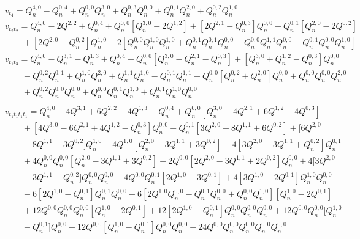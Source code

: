 \documentclass[11p,reqno]{amsart}
\numberwithin{equation}{section}
\numberwithin{equation}{section}
\begin{document}
\begin{align*}
    &v_{t_4} = Q_n^{4, 0} - Q_n^{0, 4} + Q_n^{0, 0}Q_n^{3, 0} + Q_n^{0, 3}Q_n^{0, 0} + Q_n^{0, 1}Q_n^{2, 0} + Q_n^{0, 2}Q_n^{1, 0}\\
    &v_{t_2t_2} = Q_n^{4, 0} - 2Q^{2, 2} + Q_n^{0, 4} + Q_n^{0, 0}[Q_n^{3, 0} - 2Q^{1, 2}] + [2Q^{2, 1} - Q_n^{0, 3}]Q_n^{0, 0} + Q_n^{0, 1}[Q_n^{2, 0} - 2Q^{0, 2}] \\
    & \qquad + [2Q^{2, 0} - Q_n^{0, 2}]Q_n^{1, 0} + 2[Q_n^{0, 0}Q_n^{1, 0}Q_n^{1, 0} + Q_n^{0, 1}Q_n^{0, 1}Q_n^{0, 0} + Q_n^{0, 0}Q_n^{1, 1}Q_n^{0, 0} + Q_n^{0, 1}Q_n^{0, 0}Q_n^{1, 0}] \\
    &v_{t_1t_3} = Q_n^{4, 0} - Q_n^{3, 1} - Q_n^{1, 3} + Q_n^{0, 4} + Q_n^{0, 0}[Q_n^{3, 0} - Q_n^{2, 1} - Q_n^{0, 3}] + [Q_n^{3, 0} + Q_n^{1, 2} - Q_n^{0, 3}]Q_n^{0, 0} \\
    & \qquad - Q_n^{0, 2}Q_n^{0, 1} + Q_n^{1, 0}Q_n^{2, 0} + Q_n^{1, 1}Q_n^{1, 0} - Q_n^{0, 1}Q_n^{1, 1} + Q_n^{0, 0}[Q_n^{0, 2} + Q_n^{2, 0}]Q_n^{0, 0} + Q_n^{0, 0}Q_n^{0, 0}Q_n^{2, 0} \\ 
    & \qquad + Q_n^{0, 2}Q_n^{0, 0}Q_n^{0, 0} + Q_n^{0, 0}Q_n^{0, 1}Q_n^{1, 0} + Q_n^{0, 1}Q_n^{1, 0}Q_n^{0, 0} \\
\end{align*}
\begin{align*}
    &v_{t_1t_1t_1t_1} = Q_n^{4, 0} - 4Q^{3, 1} + 6Q^{2, 2} -4Q^{1, 3} + Q_n^{0, 4} + Q_n^{0, 0}[Q_n^{3, 0} - 4Q^{2, 1} + 6Q^{1, 2} - 4Q^{0, 3}] \\ 
    & \qquad + [4Q^{3, 0} - 6Q^{2, 1} + 4Q^{1, 2} - Q_n^{0, 3}]Q_n^{0, 0} - Q_n^{0, 1}[3Q^{2, 0} - 8Q^{1, 1} + 6Q^{0, 2}] + [6Q^{2, 0} \\ 
    & \qquad - 8Q^{1, 1} + 3Q^{0, 2}]Q_n^{1, 0} + 4Q^{1, 0}[Q_n^{2, 0} - 3Q^{1, 1} + 3Q^{0, 2}] - 4[3Q^{2, 0} - 3Q^{1, 1} + Q_n^{0, 2}]Q_n^{0, 1} \\ 
    & \qquad + 4 Q_n^{0, 0}Q_n^{0, 0}[Q_n^{2, 0} - 3Q^{1, 1} + 3Q^{0, 2}] + 2Q^{0, 0}[2Q^{2, 0} - 3Q^{1, 1} + 2Q^{0, 2}]Q_n^{0, 0} + 4[3Q^{2, 0} \\
    & \qquad - 3Q^{1, 1} + Q_n^{0, 2}]Q_n^{0, 0}Q_n^{0, 0} -4Q^{0, 0}Q_n^{0, 1}[2Q^{1, 0} - 3Q^{0, 1}] + 4[3Q^{1, 0} - 2Q^{0, 1}]Q_n^{1, 0}Q_n^{0, 0} \\
    & \qquad -6[2Q^{1, 0} - Q_n^{0, 1}]Q_n^{0, 1}Q_n^{0, 0} + 6[2Q^{1, 0}Q_n^{0, 0} - Q_n^{0, 1}Q_n^{0, 0} + Q_n^{0, 0}Q_n^{1, 0}][Q_n^{1, 0} - 2Q^{0, 1}] \\
    & \qquad + 12Q^{0, 0}Q_n^{0, 0}Q_n^{0, 0}[Q_n^{1, 0} - 2Q^{0, 1}] + 12[2Q^{1, 0} - Q_n^{0, 1}]Q_n^{0, 0}Q_n^{0, 0}Q_n^{0, 0} + 12Q^{0, 0}Q_n^{0, 0}[Q_n^{1, 0} \\ 
    & \qquad - Q_n^{0, 1}]Q_n^{0, 0} + 12Q^{0, 0}[Q_n^{1, 0} - Q_n^{0, 1}]Q_n^{0, 0}Q_n^{0, 0} + 24Q^{0, 0}Q_n^{0, 0}Q_n^{0, 0}Q_n^{0, 0}Q_n^{0, 0} 
\end{align*}
\end{document}
